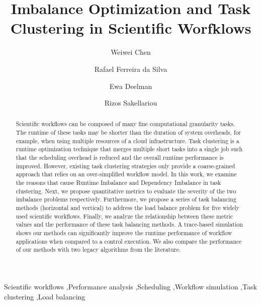 \documentclass[final,5p,times,twocolumn]{elsarticle}
\begin{document}
\begin{frontmatter}

\title{Imbalance Optimization and Task Clustering in Scientific Worfklows}


\author[isi]{Weiwei Chen}

\author[isi]{Rafael Ferreira da Silva}

\author[isi]{Ewa Deelman}

\author[man]{Rizos Sakellariou}



\address[isi]{University of Southern California, Information Sciences Institute, Marina del Rey, CA, USA}
\address[man]{University of Manchester, School of Computer Science, Manchester, U.K.}


\begin{abstract}
Scientific workflows can be composed of many fine computational granularity tasks. The runtime of these tasks may be shorter than the duration of system overheads, for example, when using multiple resources of a cloud infrastructure. Task clustering is a runtime optimization technique that merges multiple short tasks into a single job such that the scheduling overhead is reduced and the overall runtime performance is improved. However, existing task clustering strategies only provide a coarse-grained approach that relies on an over-simplified workflow model. In this work, we examine the reasons that cause Runtime Imbalance and Dependency Imbalance in task clustering. Next, we propose quantitative metrics to evaluate the severity of the two imbalance problems respectively. Furthermore, we propose a series of task balancing methods (horizontal and vertical) to address the load balance problem for five widely used scientific workflows. Finally, we analyze the relationship between these metric values and the performance of these task balancing methods. A trace-based simulation shows our methods can significantly improve the runtime performance of workflow applications when compared to a control execution. We also compare the performance of our methods with two legacy algorithms from the literature.

\end{abstract}

\begin{keyword}
Scientific workflows \sep Performance analysis \sep Scheduling \sep Workflow simulation \sep Task clustering \sep Load balancing
\end{keyword}

\end{frontmatter}















\end{document}
